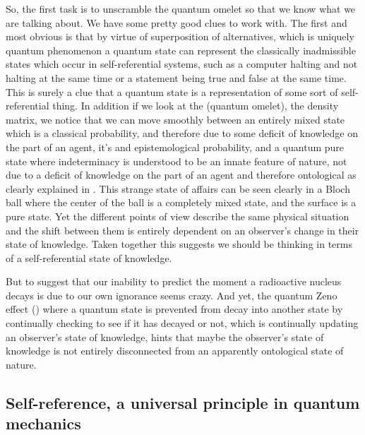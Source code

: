 \documentclass{article}
\begin{document}
So, the first task is to unscramble the quantum omelet so that we know what we are talking about. We have some pretty good clues to work with. The first and most obvious is that by virtue of superposition of alternatives, which is uniquely quantum phenomenon a quantum state can represent the classically inadmissible states which occur in self-referential systems, such as a computer halting and not halting at the same time \autocite{szangolies_2020} or a statement being true and false at the same time. This is surely a clue that a quantum state is a representation of some sort of self-referential thing. In addition if we look at the \textquote(quantum omelet), the density matrix,  we notice that we can move smoothly between an entirely mixed state which is a classical probability, and therefore due to some deficit of knowledge on the part of an agent, it's and epistemological probability, and a quantum pure state where indeterminacy is understood to be an innate feature of nature, not due to a deficit of knowledge on the part of an agent and therefore ontological as clearly explained in \autocite{brukner_2000}. This strange state of affairs can be seen clearly in a Bloch ball where the center of the ball is a completely mixed state, and the surface is a pure state. Yet the different points of view describe the same physical situation and the shift between them is entirely dependent on an observer's change in their state of knowledge. Taken together this suggests we should be thinking in terms of a self-referential state of knowledge.

But to suggest that our inability to predict the moment a radioactive nucleus decays is due to our own ignorance seems crazy. And yet, the quantum Zeno effect (\autocite{georgesu_2022, saverio_2013, Misra1977TheTheory}) where a quantum state is prevented from decay into another state by continually checking to see if it has decayed or not, which is continually updating an observer's state of knowledge, hints that maybe the observer's state of knowledge is not entirely disconnected from an apparently ontological state of nature.


\subsection{Self-reference, a universal principle in quantum mechanics}
\end{document}
